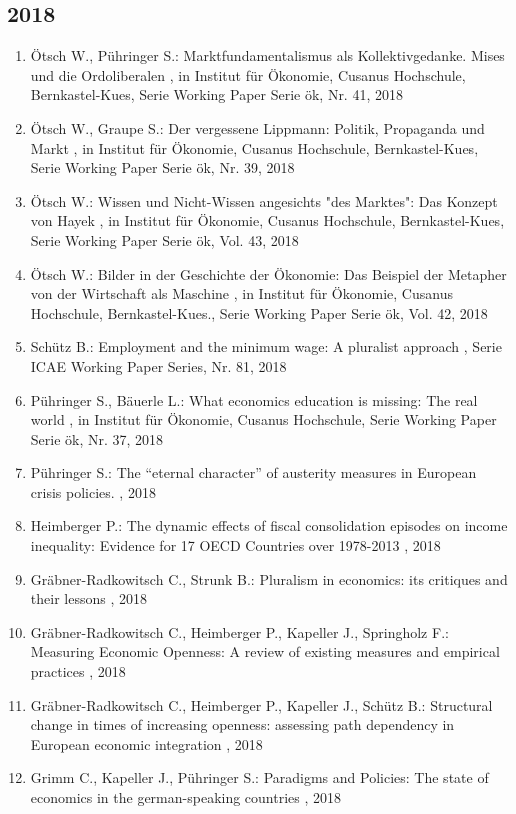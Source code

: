  \subsection*{2018} 
 \begin{enumerate}[leftmargin=*, labelsep=0.5cm] 
	 \item Ötsch W., Pühringer S.:  Marktfundamentalismus als Kollektivgedanke. Mises und die Ordoliberalen  , in Institut für Ökonomie, Cusanus Hochschule, Bernkastel-Kues, Serie Working Paper Serie ök, Nr. 41, 2018
	 \item Ötsch W., Graupe S.:  Der vergessene Lippmann: Politik, Propaganda und Markt  , in Institut für Ökonomie, Cusanus Hochschule, Bernkastel-Kues, Serie Working Paper Serie ök, Nr. 39, 2018
	 \item Ötsch W.:  Wissen und Nicht-Wissen angesichts "des Marktes": Das Konzept von Hayek  , in Institut für Ökonomie, Cusanus Hochschule, Bernkastel-Kues, Serie Working Paper Serie ök, Vol. 43, 2018
	 \item Ötsch W.:  Bilder in der Geschichte der Ökonomie: Das Beispiel der Metapher von der Wirtschaft als Maschine  , in Institut für Ökonomie, Cusanus Hochschule, Bernkastel-Kues., Serie Working Paper Serie ök, Vol. 42, 2018
	 \item Schütz B.:  Employment and the minimum wage: A pluralist approach  , Serie ICAE Working Paper Series, Nr. 81, 2018
	 \item Pühringer S., Bäuerle L.:  What economics education is missing: The real world  , in Institut für Ökonomie, Cusanus Hochschule, Serie Working Paper Serie ök, Nr. 37, 2018
	 \item Pühringer S.:  The “eternal character” of austerity measures in European crisis policies.  , 2018
	 \item Heimberger P.:  The dynamic effects of fiscal consolidation episodes on income inequality: Evidence for 17 OECD Countries over 1978-2013  , 2018
	 \item Gräbner-Radkowitsch C., Strunk B.:  Pluralism in economics: its critiques and their lessons  , 2018
	 \item Gräbner-Radkowitsch C., Heimberger P., Kapeller J., Springholz F.:  Measuring Economic Openness: A review of existing measures and empirical practices  , 2018
	 \item Gräbner-Radkowitsch C., Heimberger P., Kapeller J., Schütz B.:  Structural change in times of increasing openness: assessing path dependency in European economic integration  , 2018
	 \item Grimm C., Kapeller J., Pühringer S.:  Paradigms and Policies: The state of economics in the german-speaking countries  , 2018

\end{enumerate}
